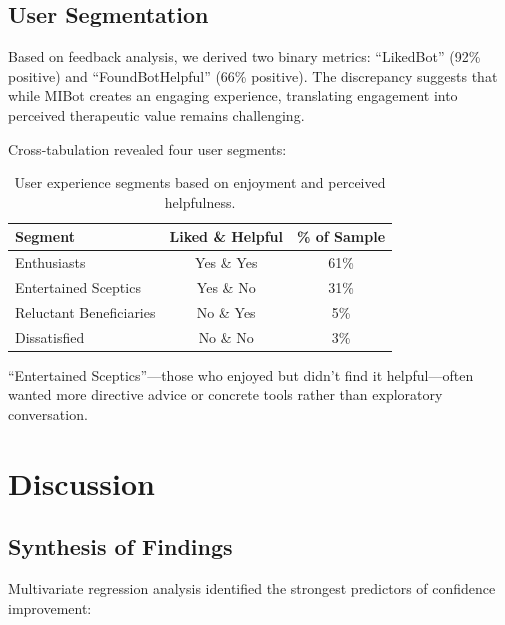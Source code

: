 \subsection{User Segmentation}

Based on feedback analysis, we derived two binary metrics: ``LikedBot'' (92\% positive) and ``FoundBotHelpful'' (66\% positive). The discrepancy suggests that while MIBot creates an engaging experience, translating engagement into perceived therapeutic value remains challenging.

Cross-tabulation revealed four user segments:

\begin{table}[ht]
  \centering
  \small
  \setlength{\tabcolsep}{4pt}
  \renewcommand{\arraystretch}{1.1}
  \begin{tabular}{@{}lcc@{}}
    \toprule
    \textbf{Segment} & \textbf{Liked \& Helpful} & \textbf{\% of Sample} \\
    \midrule
    Enthusiasts & Yes \& Yes & 61\% \\
    Entertained Sceptics & Yes \& No & 31\% \\
    Reluctant Beneficiaries & No \& Yes & 5\% \\
    Dissatisfied & No \& No & 3\% \\
    \bottomrule
  \end{tabular}
  \caption{User experience segments based on enjoyment and perceived helpfulness.}
  \label{table:user_segments}
\end{table}

``Entertained Sceptics''---those who enjoyed but didn't find it helpful---often wanted more directive advice or concrete tools rather than exploratory conversation.

\section{Discussion}
\label{sec:discussion}

\subsection{Synthesis of Findings}

Multivariate regression analysis identified the strongest predictors of confidence improvement:

